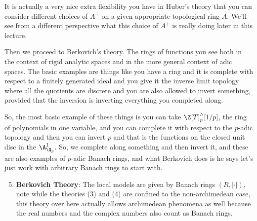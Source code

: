 It is  actually a very nice extra flexibility you have in Huber's theory that you can consider different choices of $A^+$ on a given 
appropriate topological ring $A$. We'll see from a different perspective what this choice of $A^+$ is really doing later in this 
lecture.



 Then we proceed to Berkovich's theory. The rings of functions you see both in the context of rigid analytic spaces and in the 
 more general context of adic spaces. The basic examples are things like you have a ring and it is complete with respect to a 
 finitely generated ideal and you give it the inverse limit topology where all the quotients are discrete and you are also allowed 
 to invert something, provided that the inversion is inverting everything you completed along.

 So, the most basic example of these things is you can take $\Z[T]^{\wedge}_{p}[1/p]$, the ring of polynomials in one variable, and 
 you can complete it with respect to the $p$-adic topology and then you can invert $p$ and that is  the functions on the closed unit 
 disc in the $\A^1_{\Q_p}$. So, we complete along something and then invert it, and these are also examples of $p$-adic Banach 
 rings, and what Berkovich does is he says let's just work with arbitrary Banach rings to start with.
 
\begin{enumerate}
    \setcounter{enumi}{4} 
    \item \textbf{Berkovich Theory}: The local models are given by Banach rings $(R, |\cdot|)$, note while the theories (3) and (4) 
    are confined to the non-archimedean case, this theory over here actually allows archimedean phenomena as well because the real 
    numbers and the complex numbers also count as Banach rings.
\end{enumerate}

